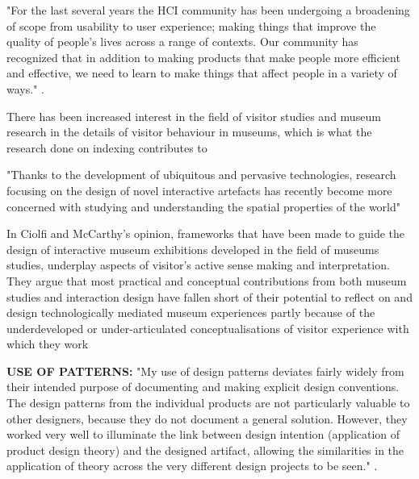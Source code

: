 "For the last several years the HCI community has been undergoing a broadening of scope from usability to user experience; making things that improve the quality of people’s lives across a range of contexts. Our community has recognized that in addition to making products that make people more efficient and effective, we need to learn to make things that affect people in a variety of ways." \autocite[p. 395]{zimmerman_designing_2009}. 

There has been increased interest in the field of visitor studies and museum research in the details of visitor behaviour in museums, which is what the research done on indexing contributes to \autocite[p. 41]{hornecker_to-and-fro_2016}


"Thanks to the development of ubiquitous and pervasive technologies, research focusing on the design of novel interactive artefacts has recently become more concerned with studying and understanding the spatial properties of the world" \autocite[p. 159]{hybridplace_ciolfi}

In Ciolfi and McCarthy’s opinion, frameworks that have been made to guide the design of interactive museum exhibitions developed in the field of museums studies, underplay aspects of visitor’s active sense making and interpretation. They argue that most practical and conceptual contributions from both museum studies and interaction design have fallen short of their potential to reflect on and design technologically mediated museum experiences partly because of the underdeveloped or under-articulated conceptualisations of visitor experience with which they work \autocite[p. 248]{mccarthy_place}


\textbf{USE OF PATTERNS:} "My use of design patterns deviates fairly widely from their intended purpose of documenting and making explicit design conventions. The design patterns from the individual products are not particularly valuable to other designers, because they do not document a general solution. However, they worked very well to illuminate the link between design intention (application of product design theory) and the designed artifact, allowing the similarities in the application of theory across the very different design projects to be seen." \autocite[p. 402]{zimmerman_designing_2009}.


